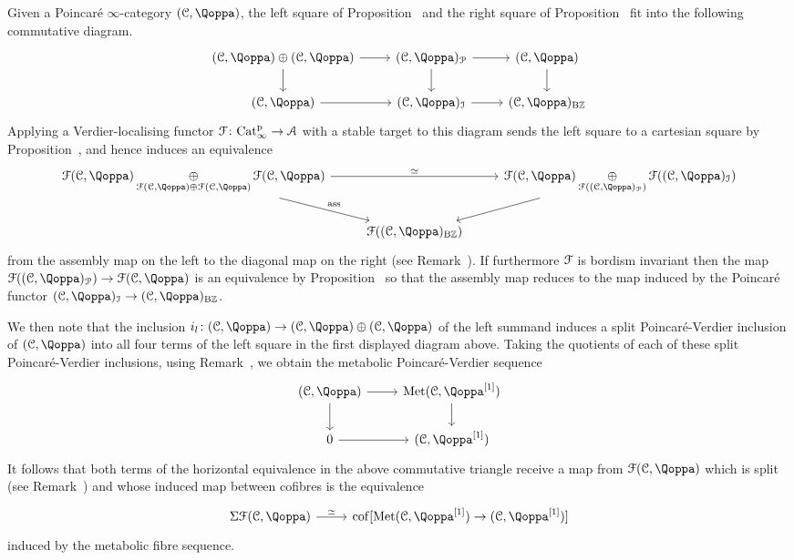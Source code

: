 \begin{remark}
\label{remark:I-is-assembly}%
Given a Poincaré $\infty$-category $(\C,\QF)$, the left square of Proposition~ and the right square of Proposition~ fit into the following commutative diagram.
\[
\begin{tikzcd}
(\C,\QF) \oplus (\C,\QF) \ar[d]\ar[r] & (\C,\QF)_{\mathcal{P}} \ar[d]\ar[r] & (\C,\QF) \ar[d] \\
(\C,\QF) \ar[r] & (\C,\QF)_\I \ar[r] & (\C,\QF)_{\B\ZZ}
\end{tikzcd}
\]
Applying a Verdier-localising functor $\mathcal{F}\colon \mathrm{Cat}^{\mathrm p}_\infty \to \mathcal{A}$ with a stable target to this diagram sends the left square to a cartesian square by Proposition~, and hence induces an equivalence
\[
\begin{tikzcd}
\F(\C,\QF) \displaystyle\mathop{\oplus}_{\F(\C,\QF) \oplus \F(\C,\QF)} \F(\C,\QF)\ar[dr,"\ass"]\ar[rr,"\simeq"] && \F(\C,\QF) \displaystyle\mathop{\oplus}_{\F((\C,\QF)_{\mathcal{P}})} \F((\C,\QF)_\I)  \ar[dl] \\
& \F((\C,\QF)_{\B\ZZ}) &
\end{tikzcd}
\]
from the assembly map on the left to the diagonal map on the right (see Remark~). If furthermore $\mathcal{F}$ is bordism invariant then the map $\F((\C,\QF)_{\mathcal{P}}) \to \F(\C,\QF)$ is an equivalence by Proposition~ so that the assembly map reduces to the map induced by the Poincaré functor $(\C,\QF)_\I \to (\C,\QF)_{\B\ZZ}$.

 
We then note that the inclusion $i_l\colon (\C,\QF) \to (\C,\QF) \oplus (\C,\QF)$ of the left summand induces a split Poincar\'e-Verdier inclusion of $(\C,\QF)$ into all four terms of the left square in the first displayed diagram above. Taking the quotients of each of these split Poincar\'e-Verdier inclusions, using Remark~, we obtain the metabolic Poincar\'e-Verdier sequence
\[
\begin{tikzcd}
	(\C,\QF) \ar[r] \ar[d] & \Met(\C,\QF\qshift{1}) \ar[d] \\
	0 \ar[r] & (\C,\QF\qshift{1})
\end{tikzcd}
\]
It follows that both terms of the horizontal equivalence in the above commutative triangle receive a map from $\F(\C,\QF)$ which is split (see Remark~) and whose induced map between cofibres is the equivalence
\[
\begin{tikzcd} \Sigma \F(\C,\QF) \ar[r,"\simeq"] & \cof[\Met(\C,\QF\qshift{1}) \to (\C,\QF\qshift{1})] \end{tikzcd}
\]
induced by the metabolic fibre sequence.
\end{remark}





